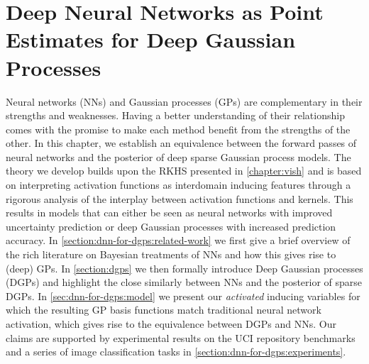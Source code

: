 \ifpdf
    \graphicspath{{Chapter4/Figs/Vector/}{Chapter4/Figs/PDF/}{Chapter4/Figs/}}
\else
    \graphicspath{{Chapter4/Figs/Raster/}{Chapter4/Figs/}}
\fi



\chapter{Deep Neural Networks as Point Estimates for Deep Gaussian Processes}
\label{chapter:dnn-as-point-estimate-for-dgps}

Neural networks (NNs) and Gaussian processes (GPs) are complementary in their strengths and weaknesses. Having a better understanding of their relationship comes with the promise to make each method benefit from the strengths of the other. In this chapter, we establish an equivalence between the forward passes of neural networks and the posterior of deep sparse Gaussian process models. The theory we develop builds upon the RKHS presented in \cref{chapter:vish} and is based on interpreting activation functions as interdomain inducing features through a rigorous analysis of the interplay between activation functions and kernels. This results in models that can either be seen as neural networks with improved uncertainty prediction or deep Gaussian processes with increased prediction accuracy. In \cref{section:dnn-for-dgps:related-work} we first give a brief overview of the rich literature on Bayesian treatments of NNs and how this gives rise to (deep) GPs. In \cref{section:dgps} we then formally introduce Deep Gaussian processes (DGPs) and highlight the close similarly between NNs and the posterior of sparse DGPs. In \cref{sec:dnn-for-dgps:model} we present our \emph{activated} inducing variables for which the resulting GP basis functions match traditional neural network activation, which gives rise to the equivalence between DGPs and NNs.  Our claims are supported by experimental results on the UCI repository benchmarks and a series of image classification tasks in \cref{section:dnn-for-dgps:experiments}.

